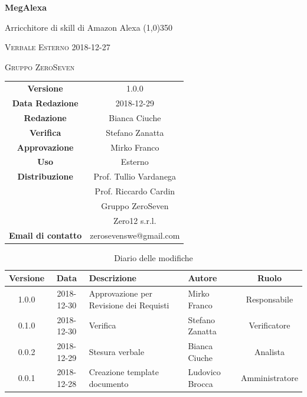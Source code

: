 \documentclass[a4paper,12pt]{article}
\author{Bianca Ciuche}
\date{2018-12-27}
\begin{document}
\begin{titlepage}
	\centering
	{\huge\bfseries MegAlexa\par}
	Arricchitore di skill di Amazon Alexa
	\line(1,0){350} \\
	{\scshape\LARGE Verbale Esterno 2018-12-27 \par}
	\vspace{1cm}
	{\scshape Gruppo ZeroSeven \par}
	\logo
	\begin{tabular}{c|c}
		{\hfill \textbf{Versione}} 			& 1.0.0				\\
		{\hfill\textbf{Data Redazione}} 	& 2018-12-29		\\ 
		{\hfill\textbf{Redazione}} 			&  		Bianca Ciuche	\\ 
		{\hfill\textbf{Verifica}} 				&  	Stefano Zanatta			\\ 
		{\hfill\textbf{Approvazione}} 		&  		Mirko Franco	\\ 
		{\hfill\textbf{Uso}} 					& 	Esterno	\\ 
		{\hfill\textbf{Distribuzione}} 			& 			Prof. Tullio Vardanega \\ & Prof. Riccardo Cardin \\ & Gruppo ZeroSeven	\\ & Zero12 s.r.l. \\
		{\hfill\textbf{Email di contatto}} & zerosevenswe@gmail.com \\
	\end{tabular}
\end{titlepage}
	
		\label{LastFrontPage}
	
	
	\newpage
	\cleardoublepage
	\begin{table}[tbph]
		\centering
		\begin{tabularx}{\textwidth}{|c|c|X|X|c|}
			\hline
			\textbf{Versione} & \textbf{Data} & \textbf{Descrizione} & \textbf{Autore} & \textbf{Ruolo} \\
			\hline
			1.0.0 & 2018-12-30 & Approvazione per Revisione dei Requisti & Mirko Franco & Responsabile \\
			\hline
			0.1.0 & 2018-12-30 & Verifica & Stefano Zanatta &Verificatore \\
			\hline
			0.0.2 & 2018-12-29 & Stesura verbale & Bianca Ciuche &Analista \\
			\hline
			0.0.1 & 2018-12-28 & Creazione template documento
			& Ludovico Brocca & Amministratore\\
			\hline
		\end{tabularx}
		\caption{Diario delle modifiche}
	\end{table}
	
\end{document}
